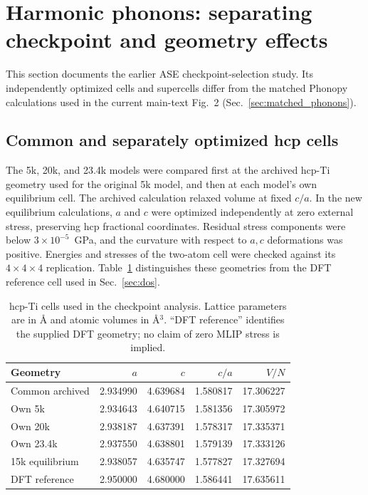 \documentclass[10pt]{article}
\begin{document}
\section{Harmonic phonons: separating checkpoint and geometry effects}
\label{sec:phonons}
This section documents the earlier ASE checkpoint-selection study. Its independently optimized cells and supercells differ from the matched Phonopy calculations used in the current main-text Fig.~2 (Sec.~\ref{sec:matched_phonons}).
\subsection{Common and separately optimized hcp cells}
The 5k, 20k, and 23.4k models were compared first at the archived hcp-Ti geometry used for the original 5k model, and then at each model's own equilibrium cell. The archived calculation relaxed volume at fixed $c/a$. In the new equilibrium calculations, $a$ and $c$ were optimized independently at zero external stress, preserving hcp fractional coordinates. Residual stress components were below $3\times10^{-5}$~GPa, and the curvature with respect to $a,c$ deformations was positive. Energies and stresses of the two-atom cell were checked against its $4\times4\times4$ replication. Table~\ref{tab:cells} distinguishes these geometries from the DFT reference cell used in Sec.~\ref{sec:dos}.

\begin{table}[htbp]
\centering
\caption{hcp-Ti cells used in the checkpoint analysis. Lattice parameters are in \AA{} and atomic volumes in \AA$^3$. ``DFT reference'' identifies the supplied DFT geometry; no claim of zero MLIP stress is implied.}
\label{tab:cells}
\begin{tabular}{lrrrr}
\toprule
Geometry & $a$ & $c$ & $c/a$ & $V/N$\\
\midrule
Common archived & 2.934990 & 4.639684 & 1.580817 & 17.306227\\
Own 5k & 2.934643 & 4.640715 & 1.581356 & 17.305972\\
Own 20k & 2.938187 & 4.637391 & 1.578317 & 17.335371\\
Own 23.4k & 2.937550 & 4.638801 & 1.579139 & 17.333126\\
15k equilibrium & 2.938057 & 4.635747 & 1.577827 & 17.327694\\
DFT reference & 2.950000 & 4.680000 & 1.586441 & 17.635611\\
\bottomrule
\end{tabular}
\end{table}
\end{document}
